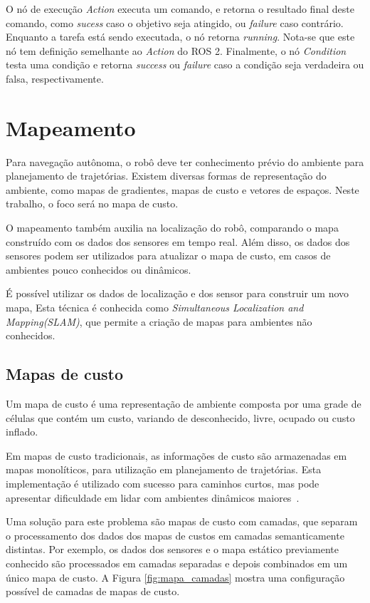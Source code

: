 \documentclass[repeatfields,xlists,xpacks,oneside,yearsonly]{ufrgscca}
\begin{document}
O nó de execução \textit{Action} executa um comando, e retorna o resultado final deste comando,
como \textit{sucess} caso o objetivo seja atingido, ou \textit{failure} caso contrário.
Enquanto a tarefa está sendo executada, o nó retorna \textit{running}.
Nota-se que este nó tem definição semelhante ao \textit{Action} do ROS 2.
Finalmente, o nó \textit{Condition} testa uma condição e retorna \textit{success} ou \textit{failure}
caso a condição	seja verdadeira ou falsa, respectivamente.

\section{Mapeamento}

Para navegação autônoma, o robô deve ter conhecimento prévio do ambiente
para planejamento de trajetórias.
Existem diversas formas de representação do ambiente,
como mapas de gradientes, mapas de custo e vetores de espaços.
Neste trabalho, o foco será no mapa de custo.

O mapeamento também auxilia na localização do robô, comparando o mapa construído
com os dados dos sensores em tempo real. Além disso, os dados dos sensores podem ser
utilizados para atualizar o mapa de custo, em casos de ambientes pouco conhecidos ou dinâmicos.

É possível utilizar os dados de localização e dos sensor para construir um novo mapa,
Esta técnica é conhecida como \textit{Simultaneous Localization and Mapping(SLAM)}, que
permite a criação de mapas para ambientes não conhecidos.

\subsection{Mapas de custo}

Um mapa de custo é uma representação de ambiente composta por uma
grade de células que contém um custo, variando de desconhecido, livre,
ocupado ou custo inflado.

Em mapas de custo tradicionais, as informações de custo são armazenadas em mapas monolíticos,
para utilização em planejamento de trajetórias.
Esta implementação é utilizado com sucesso para caminhos curtos,
mas pode apresentar dificuldade em lidar com ambientes dinâmicos maiores~\cite{layered_costmaps}.

Uma solução para este problema são mapas de custo com camadas,
que separam o processamento dos dados dos mapas de custos em camadas semanticamente distintas.
Por exemplo, os dados dos sensores e o mapa estático previamente conhecido são processados
em camadas separadas e depois combinados em um único mapa de custo.
A Figura \ref{fig:mapa_camadas} mostra uma configuração possível de camadas de mapas de custo.
\end{document}
